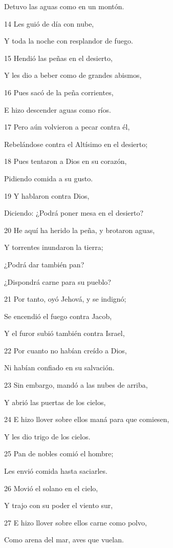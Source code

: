 \par Detuvo las aguas como en un montón.
\par 14 Les guió de día con nube,
\par Y toda la noche con resplandor de fuego.
\par 15 Hendió las peñas en el desierto,
\par Y les dio a beber como de grandes abismos,
\par 16 Pues sacó de la peña corrientes,
\par E hizo descender aguas como ríos.
\par 17 Pero aún volvieron a pecar contra él,
\par Rebelándose contra el Altísimo en el desierto;
\par 18 Pues tentaron a Dios en su corazón,
\par Pidiendo comida a su gusto.
\par 19 Y hablaron contra Dios,
\par Diciendo: ¿Podrá poner mesa en el desierto?
\par 20 He aquí ha herido la peña, y brotaron aguas,
\par Y torrentes inundaron la tierra;
\par ¿Podrá dar también pan?
\par ¿Dispondrá carne para su pueblo?
\par 21 Por tanto, oyó Jehová, y se indignó;
\par Se encendió el fuego contra Jacob,
\par Y el furor subió también contra Israel,
\par 22 Por cuanto no habían creído a Dios,
\par Ni habían confiado en su salvación.
\par 23 Sin embargo, mandó a las nubes de arriba,
\par Y abrió las puertas de los cielos,
\par 24 E hizo llover sobre ellos maná para que comiesen,
\par Y les dio trigo de los cielos.
\par 25 Pan de nobles comió el hombre;
\par Les envió comida hasta saciarles.
\par 26 Movió el solano en el cielo,
\par Y trajo con su poder el viento sur,
\par 27 E hizo llover sobre ellos carne como polvo,
\par Como arena del mar, aves que vuelan.
